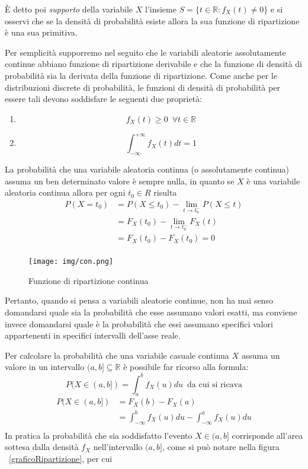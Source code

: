 \documentclass[a4paper,12pt, oneside]{book}
\newcommand{\numberset}{\mathbb}
\newcommand{\R}{\numberset{R}}
\begin{document}
È detto poi \emph{supporto} della variabile $X$ l'insieme $S = \{t \in \R : f_X(t) \neq 0\}$
e si osservi che se la densità di probabilità esiste allora la sua funzione di ripartizione è una sua
primitiva.

Per semplicità supporremo nel seguito che le variabili aleatorie assolutamente continue abbiano funzione
di ripartizione derivabile e che la funzione di densità di probabilità sia la derivata della funzione di ripartizione.\newline
Come anche per le distribuzioni discrete di probabilità, le funzioni di densità di probabilità 
per essere tali devono soddisfare le seguenti due proprietà:
\begin{enumerate}
    \item \[f_X(t) \geq 0\,\,\, \forall t \in \R\]
    \item \[\int _{-\infty}^{+\infty} f_X(t)dt = 1\]
\end{enumerate}
La probabilità che una variabile aleatoria continua (o assolutamente continua) assuma un ben determinato valore
è sempre nulla, in quanto se $X$ è una variabile aleatoria continua allora per ogni $t_0 \in R$ risulta
\[ \begin{split}
    P(X = t_0) & = P(X \leq t_0) - \lim _{t \to t_0^-} P(X \leq t) \\
               & = F_X(t_0) - \lim_{t \to t_0^-} F_X(t) \\
               & = F_X(t_0) - F_X(t_0) = 0\\
   \end{split} \]

\begin{figure}
    \centering
    \caption{Funzione di ripartizione continua}
    \label{img:ripartizioneContinua}
    \texttt{[image: img/con.png]}
\end{figure}
Pertanto, quando si pensa a variabili aleatorie continue, non ha mai senso domandarsi quale sia la probabilità
che esse assumano valori esatti, ma conviene invece domandarsi quale è la probabilità che essi assumano
specifici valori appartenenti in specifici intervalli dell'asse reale.

Per calcolare la probabilità che una variabile casuale continua $X$ assuma un valore in un intervallo 
$(a,b] \subseteq \R$ è possibile far ricorso alla formula:
\[ P(X \in (a,b]) = \int _a ^b f_X(u)du\,\,\,  \text{da cui si ricava}\]
\[ \begin{split}
    P(X \in (a, b]) & = F_X(b) - F_X(a) \\
                    & = \int_{-\infty}^b f_X(u)du - \int_{-\infty}^a f_X(u)du\\
   \end{split} \]
In pratica la probabilità che sia soddisfatto l'evento $X\in(a,b]$ corrisponde all'area sottesa
dalla densità $f_X$ nell'intervallo $(a,b]$, come si può notare nella figura ~\ref{graficoRipartizione}, per cui
\end{document}
